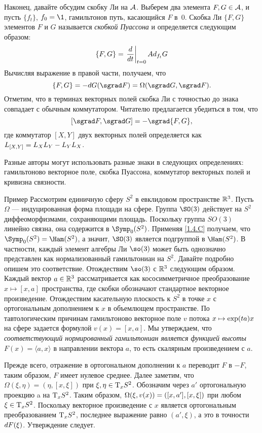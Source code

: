 Наконец, давайте обсудим скобку Ли на $\mathcal{A}$.
Выберем два элемента $F,G \in \mathcal{A}$, и пусть $\{f_t\}$, $f_0 = \1$, гамильтонов путь, касающийся $F$ в~$0$.
Скобка Ли $\{F, G\}$ элементов $F$ и $G$ называется \emph{скобкой Пуассона} и определяется следующим образом: 
\[\{F, G\}=\left.\frac{d}{d t}\right|_{t=0}Ad_{f_t}G\]
Вычисляя выражение в правой части, получаем, что 
\[\{F, G\} = -\d G (\sgrad F) = \Omega (\sgrad G, \sgrad F).\]
Отметим, что в терминах векторных полей скобка Ли с точностью до знака совпадает с обычным коммутатором.
Читателю предлагается убедиться в том, что 
\[[\sgrad F, \sgrad G] = -\sgrad  \{F, G\},\]
где коммутатор $[X, Y]$ двух векторных полей определяется как $L_{[X, Y]} \z= L_X L_Y -L_Y L_X$.

\begin{framed}
 Разные авторы могут использовать разные
знаки в следующих определениях:
гамильтоново векторное поле,
скобка Пуассона,
коммутатор векторных полей
и кривизна связности.
\end{framed}

\begin{ex}{Пример}\label{1.4.H}
Рассмотрим единичную сферу $S^2$ в евклидовом пространстве $\mathbb{R}^3$.
Пусть $\Omega$ — индуцированная форма площади на сфере.
Группа $\SO(3)$ действует на $S^2$ диффеоморфизмами, сохраняющими площадь.
Поскольку группа $SO(3)$ линейно связна, она содержится в $\Symp_0 (S^2)$.
Применяя \ref{1.4.C} получаем, что $\Symp_0 (S^2) \z= \Ham (S^2)$, а значит, $\SO (3)$ является подгруппой в $\Ham (S^2)$.
В частности, каждый элемент алгебры Ли $\so(3)$ может быть однозначно представлен как нормализованный гамильтониан на $S^2$.
Давайте подробно опишем это соответствие.
Отождествим $\so (3)$ с $\mathbb{R}^3$ следующим образом.
Каждый вектор $a \in \mathbb{R}^3$ рассматривается как кососимметричное преобразование $x \mapsto [x, a]$ пространства, где скобки обозначают стандартное векторное произведение.
Отождествим касательную плоскость к $S^2$ в точке $x$ с ортогональным
дополнением к $x$ в объемлющем пространстве.
По тавтологическим причинам гамильтоново векторное поле $v$ потока $x \z\mapsto \exp (ta) x$ на сфере задается формулой $v (x) = [x, a]$.
Мы утверждаем, что \textit{соответствующий нормированный гамильтониан является
функцией высоты $F(x)=\langle a,x\rangle$} в направлении вектора $a$, то есть скалярным произведением с $a$.

Прежде всего, отражение в ортогональном дополнении к $a$ переводит $F$ в $-F$, таким образом, $F$ имеет нулевое среднее.
Далее заметим, что $\Omega (\xi, \eta) = (\eta, [x, \xi])$ при $\xi, \eta \in \mathrm{T}_x S^2$.
Обозначим через $a'$ ортогональную проекцию a на $\mathrm{T}_x S^2$.
Таким образом, $\Omega (\xi, v(x)) \z= ([x, a'], [x, \xi])$ при любом $\xi \in \mathrm{T}_x S^2$.
Поскольку векторное произведение с $x$ является ортогональным преобразованием $\mathrm{T}_x S^2$, последнее выражение равно $(a', \xi)$,
а это в точности $d F(\xi)$.
Утверждение следует.
\end{ex}

